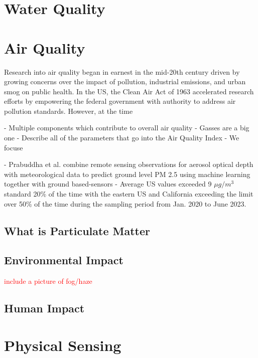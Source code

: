 \section{Water Quality}


\section{Air Quality}
Research into air quality began in
earnest in the mid-20th century driven by growing concerns over the impact of
pollution, industrial emissions, and urban smog on public health. In the US, the
Clean Air Act of 1963 accelerated research efforts by empowering the federal
government with authority to address air pollution standards. However, at the
time  


- Multiple components which contribute to overall air quality
- Gasses are a big one
- Describe all of the parameters that go into the Air Quality Index
- We focuse

- Prabuddha et al. combine remote sensing observations for aerosol optical depth
with meteorological data to predict ground level PM 2.5 using machine learning
together with ground based-sensors \cite{prabuddha-pm-satellite}
- Average US values exceeded 9 $\mu g/m^3$ standard 20\% of the time with the
eastern US and California exceeding the limit over 50\% of the time during the
sampling period from Jan. 2020 to June 2023.

\subsection{What is Particulate Matter}

\subsection{Environmental Impact}

\textcolor{red}{include a picture of fog/haze}

\subsection{Human Impact}




\section{Physical Sensing}

